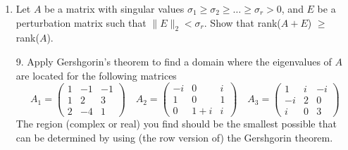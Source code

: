 \documentclass[11pt]{article}
\begin{document}
\begin{enumerate}
	\item Let \(A\) be a matrix with singular values \(\sigma_1 \geq \sigma_2 \geq \dots \geq \sigma_r > 0\), and \(E\) be a perturbation matrix such that \(\lVert E \rVert_2 < \sigma_r\).  Show that rank(\(A+E\)) \(\geq\) rank(\(A\)).

	\item[9.] Apply Gershgorin’s theorem to find a domain where the eigenvalues of \(A\) are located for the following matrices
		\[
			A_1 = \left(\begin{array}{rrr} 1 & -1 & -1 \\ 1 & 2 & 3 \\ 2 & -4 & 1 \end{array}\right) \quad
			A_2 = \left(\begin{array}{rrr} -i & 0 & i \\ 1 & 0 & 1 \\ 0 & 1+i & i \end{array}\right) \quad
			A_3 = \left(\begin{array}{rrr} 1 & i & -i \\ -i & 2 & 0 \\ i & 0 & 3 \end{array}\right)
		\]
		The region (complex or real) you find should be the smallest possible that can be determined by using (the row version of) the Gershgorin theorem.


\end{enumerate}
\end{document}

